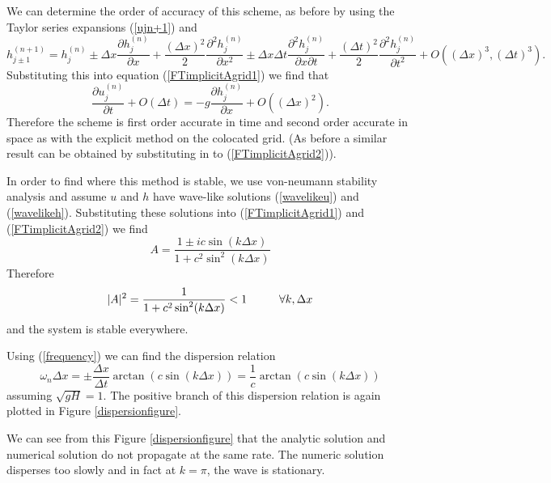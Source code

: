 \documentclass[a4paper,12pt, notitlepage]{report}
\newcommand\tab[1][0.05cm]{\hspace*{#1}}
\begin{document}
We can determine the order of accuracy of this scheme, as before by using the Taylor series expansions (\ref{ujn+1}) and
\begin{equation}
h_{j \pm 1}^{(n+1)} = h_{j}^{(n)} \pm \Delta x \frac{\partial h_{j}^{(n)}}{\partial x} + \frac{(\Delta x)^{2}}{2} \frac{\partial^{2}h_{j}^{(n)}}{\partial x^{2}} \pm \Delta x \Delta t \frac{\partial^{2}h_{j}^{(n)}}{\partial x\partial t} + \frac{(\Delta t)^{2}}{2}\frac{\partial^{2}h_{j}^{(n)}}{\partial t^{2}} + O((\Delta x)^{3}, {(\Delta t)^{3}}).
\end{equation}
Substituting this into equation (\ref{FTimplicitAgrid1}) we find that
\begin{equation}
\frac{\partial u_{j}^{(n)}}{\partial t} + O(\Delta t) = - g \frac{\partial h_{j}^{(n)}}{\partial x} + O((\Delta x)^{2}).
\end{equation}
Therefore the scheme is first order accurate in time and second order accurate in space as with the explicit method on the colocated grid. (As before a similar result can be obtained by substituting in to (\ref{FTimplicitAgrid2})).

In order to find where this method is stable, we use von-neumann stability analysis and assume $u$ and $h$ have wave-like solutions (\ref{wavelikeu}) and (\ref{wavelikeh}). Substituting these solutions into (\ref{FTimplicitAgrid1}) and (\ref{FTimplicitAgrid2}) we find
\begin{equation}
A = \frac{1 \pm i c\sin(k\Delta x)}{1 + c^{2}\sin^{2}(k\Delta x)}
\end{equation}
Therefore 
\begin{equation}
\lvert A \rvert ^{2} = \frac{1}{1 + c^{2}\sin^{2}(k\Delta x)} < 1  \tab[1cm] \forall k, \Delta x
\end{equation}
and the system is stable everywhere. 

Using (\ref{frequency}) we can find the dispersion relation
\begin{equation}
\omega_{n} \Delta x = \pm\frac{\Delta x}{\Delta t} \arctan(c\sin(k\Delta x)) = \frac{1}{c}  \arctan(c\sin(k\Delta x))
\end{equation}
assuming $\sqrt{gH} = 1$. The positive branch of this dispersion relation is again plotted in Figure \ref{dispersionfigure}.

We can see from this Figure \ref{dispersionfigure} that the analytic solution and numerical solution do not propagate at the same rate. The numeric solution disperses too slowly and in fact at $k = \pi$, the wave is stationary. 
\end{document}
